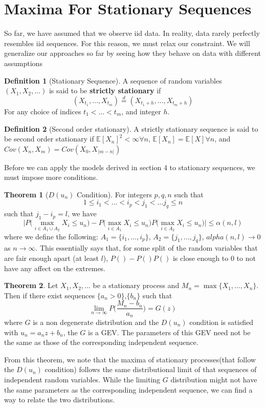 \documentclass{article}
\theoremstyle{definition}
\newtheorem{theorem}{Theorem}
\theoremstyle{definition}
\newtheorem{definition}{Definition}
\def\E{\mathbb{E}}
\begin{document}
\section{Maxima For Stationary Sequences}
So far, we have assumed that we observe iid data. In reality, data rarely perfectly resembles iid sequences. For this reason, we must relax our constraint. We will generalize our approaches so far by seeing how they behave on data with different assumptions
\begin{definition}[Stationary Sequence] A sequence of random variables $(X_1,X_2, \hdots)$ is said to be \textbf{strictly stationary} if 
\[(X_{t_1},\hdots, X_{t_m}) \overset{d}{=} (X_{t_1+h},\hdots, X_{t_m+h}) \]
For any choice of indices $t_1<\hdots<t_m$, and integer $h$. 
\end{definition}
\begin{definition}[Second order stationary]
A strictly stationary sequence is said to be second order stationary if $\E[X_n]^2<\infty \forall n$, $\E[X_n]=\E[X] \forall n$, and $Cov(X_n, X_m)= Cov(X_0, X_{|m-n|})$
\end{definition}
Before we can apply the models derived in section 4 to stationary sequences, we must impose more conditions. 
\begin{theorem}[$D(u_n)$ Condition]
For integers $p,q,n$ such that 
\[1 \leq i_1< \hdots< i_p< j_1<\hdots j_q\leq n\]
such that $j_1- i_p=l$, we have 
\[\bigg|P\bigg(\max_{i\in A_1\cup A_2} X_i\leq u_n\bigg)- P\bigg(\max_{i\in A_1} X_i\leq u_n\bigg)P\bigg(\max_{i\in A_2} X_i\leq u_n\bigg) \bigg|\leq \alpha(n,l)\]
where we define the following:
$A_1=\{i_1, \hdots, i_p\}$, $A_2=\{j_1, \hdots, j_q\}$, $alpha(n,l)\rightarrow 0$ as $n\rightarrow \infty$. 
This essentially says that, for some split of the random variables that are fair enough apart (at least $l$), $P()-P()P()$ is close enough to 0 to not have any affect on the extremes.
\end{theorem}
\begin{theorem}
Let $X_1,X_2,\hdots$ be a stationary process and $M_n= \max\{X_1, \hdots, X_n\}$. Then if there exist sequences $\{a_n>0\}$,$\{b_n\}$ such that 
\[\lim_{n\rightarrow \infty}P\bigg( \frac{M_n-b_n}{a_n} \bigg)= G(z)\]
where $G$ is a non degenerate distribution and the $D(u_n)$ condition is satisfied with $u_n=a_nz+b_n$, the $G$ is a GEV. The parameters of this GEV need not be the same as those of the corresponding independent sequence.
\end{theorem}
From this theorem, we note that the maxima of stationary processes(that follow the $D(u_n)$ condition) follows the same distributional limit of that sequences of independent random variables. While the limiting $G$ distribution might not have the same parameters as the corresponding independent sequence, we can find a way to relate the two distributions.
\end{document}

